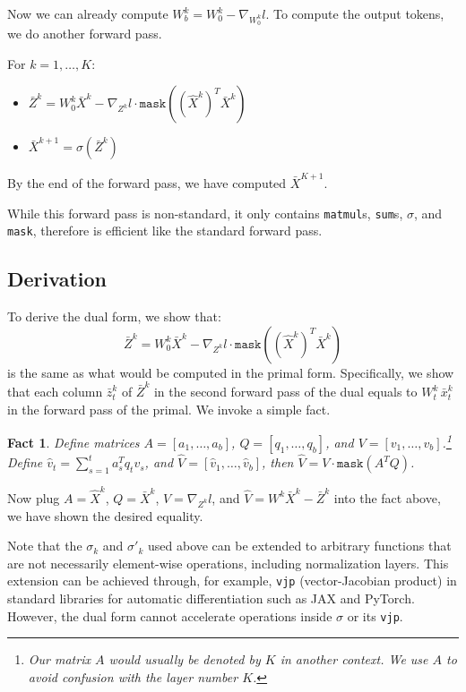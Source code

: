 \documentclass{article}
\newtheorem{fact}{Fact}
\begin{document}
Now we can already compute $W_b^k = W_0^k - \nabla_{W_0^k}l$.
To compute the output tokens, we do another forward pass.

For $k = 1,\dots,K$:
\begin{itemize}
    \item $\bar{Z}^k = W_0^k\bar{X}^k - \nabla_{Z^k}l\cdot \texttt{mask}\left( \left(\hat{X}^k\right)^T\bar{X}^k \right)$
    \item $\bar{X}^{k+1} = \sigma\left(\bar{Z}^k\right)$
\end{itemize}
By the end of the forward pass, we have computed $\bar{X}^{K+1}$.

While this forward pass is non-standard, it only contains \texttt{matmul}s, \texttt{sum}s, $\sigma$, and \texttt{mask}, therefore is efficient like the standard forward pass.

\subsection{Derivation}
To derive the dual form, we show that:
$$\bar{Z}^k = W_0^k\bar{X}^k - \nabla_{Z^k}l\cdot \texttt{mask}\left( \left(\hat{X}^k\right)^T\bar{X}^k \right)$$
is the same as what would be computed in the primal form.
Specifically, we show that each column $\bar{z}_t^k$ of $\bar{Z}^k$ in the second forward pass of the dual equals to $W_t^k \, \bar{x}_t^k$ in the forward pass of the primal.
We invoke a simple fact.
\begin{fact}
Define matrices $A = [a_1,\dots,a_b]$, $Q = [q_1,\dots,q_b]$, and $V = [v_1,\dots,v_b]$.\footnote{
Our matrix $A$ would usually be denoted by $K$ in another context.
We use $A$ to avoid confusion with the layer number $K$.
}
Define $\hat{v}_t = \sum_{s=1}^t a_s^Tq_t v_s$, and $\hat{V} = [\hat{v}_1,\dots,\hat{v}_b]$, then $\hat{V} = V \cdot \texttt{mask}(A^TQ)$.
\end{fact}

Now plug $A = \hat{X}^k$, $Q = \bar{X}^k$, $V = \nabla_{Z^k}l$, and $\hat{V} = W^k\bar{X}^k - \bar{Z}^k$ into the fact above, we have shown the desired equality.

Note that the $\sigma_k$ and $\sigma'_k$ used above can be extended to arbitrary functions that are not necessarily element-wise operations, including normalization layers.
This extension can be achieved through, for example, \texttt{vjp} (vector-Jacobian product) in standard libraries for automatic differentiation such as JAX and PyTorch. 
However, the dual form cannot accelerate operations inside $\sigma$ or its \texttt{vjp}.
\clearpage
\end{document}
